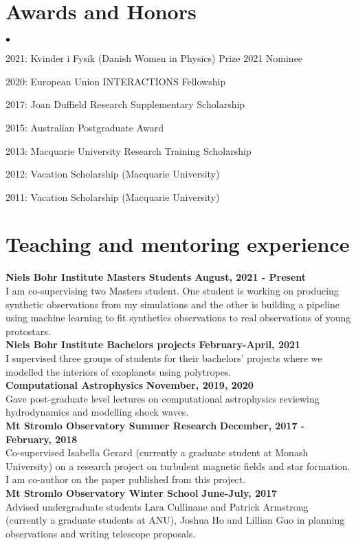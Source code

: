 \documentclass[margin,line]{res}
\newenvironment{list2}{
	\begin{list}{$\bullet$}{%
			\setlength{\itemsep}{0in}
			\setlength{\parsep}{0in} \setlength{\parskip}{0in}
			\setlength{\topsep}{0in} \setlength{\partopsep}{0in} 
			\setlength{\leftmargin}{0.2in}}}{\end{list}}
\begin{document}
\begin{resume}
		\section{\sc Awards and Honors}
		\begin{list2}
			\item 2021: Kvinder i Fysik (Danish Women in Physics) Prize 2021 Nominee
			\item 2020: European Union INTERACTIONS Fellowship
			\item 2017: Joan Duffield Research Supplementary Scholarship
			\item 2015: Australian Postgraduate Award
			\item 2013: Macquarie University Research Training Scholarship
			\item 2012: Vacation Scholarship (Macquarie University)
			\item 2011: Vacation Scholarship (Macquarie University)
		\end{list2}
		
		\section{\sc Teaching and mentoring experience}
		{\bf  Niels Bohr Institute Masters Students} \hfill {\bf August, 2021 - Present}\\
		I am co-supervising two Masters student. One student is working on producing synthetic observations from my simulations and the other is building a pipeline using machine learning to fit synthetics observations to real observations of young protostars.\\
		{\bf  Niels Bohr Institute Bachelors projects} \hfill {\bf February-April, 2021}\\
		I supervised three groups of students for their bachelors' projects where we modelled the interiors of exoplanets using polytropes.\\
		{\bf Computational Astrophysics} \hfill {\bf November, 2019, 2020}\\
		Gave post-graduate level lectures on computational astrophysics reviewing hydrodynamics and modelling shock waves.\\
		{\bf Mt Stromlo Observatory Summer Research} \hfill {\bf December, 2017 - February, 2018}\\
		Co-supervised Isabella Gerard (currently a graduate student at Monash University) on a research project on turbulent magnetic fields and star formation. I am co-author on the paper published from this project.\\
		{\bf Mt Stromlo Observatory Winter School} \hfill {\bf June-July, 2017}\\
		Advised undergraduate students Lara Cullinane and Patrick Armstrong (currently a graduate students at ANU), Joshua Ho and Lillian Guo in planning observations and writing telescope proposals.
		

\end{resume}
\end{document}
